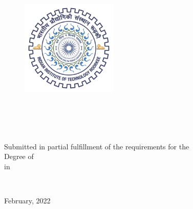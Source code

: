 \pagestyle{empty}
\begin{center}



	\vspace{1.5cm}
	{\huge\bfseries  \ttitle}


	\vspace{1.5cm}
	\begin{figure}[h]
	  \centering
	  \includegraphics[width=1.8in, height=1.8in]{01.Cover/logo.pdf}
	\end{figure}


	\vspace{0.8cm}
	{\Large \bfseries  \authorname}


	\vspace{0.8cm}
	\groupname\\
	\deptname\\
	\univname\\
	\addressname\\


	\vspace{2.8cm}
	\ifdefempty{\reptype}{}{\reptype\\}
	Submitted in partial fulfillment of the requirements for the\\
	Degree of \degreename\\
	in \subjectname



	\vspace{0.8cm}
	 \supname\\



	\vspace{0.8cm}
	February, 2022

\end{center}

